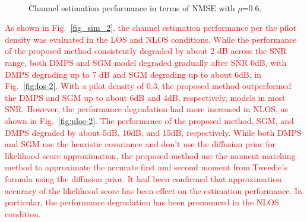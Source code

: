 \documentclass[lettersize,journal]{IEEEtran}
\begin{document}
\begin{figure}[!t]
\\
\caption{Channel estimation performance in terms of NMSE with $\rho$=0.6.}
\label{fig_sim_1}
\end{figure}

\textcolor{red}{
As shown in Fig.~\ref{fig_sim_2}, the channel estimation performance per the pilot density was evaluated in the LOS and NLOS conditions. While the performance of the proposed method consistently degraded by about 2 dB across the SNR range, both DMPS and SGM model degraded gradually after SNR 0dB, with DMPS degrading up to 7 dB and SGM degrading up to about 6dB, in Fig.~\ref{fig:los-2}. With a pilot density of 0.3, the proposed method outperformed the DMPS and SGM up to about 6dB and 4dB, respectively, models in most SNR. However, the performance degradation had more increased in NLOS, as shown in Fig.~\ref{fig:nlos-2}. The performance of the proposed method, SGM, and DMPS degraded by about 5dB, 10dB, and 15dB, respectively. While both DMPS and SGM use the heuristic covariance and don’t use the diffusion prior for likelihood score approximation, the proposed method use the moment matching method to approximate the accurate first and second moment from Tweedie’s formula using the diffusion prior. It had been confirmed that approximation accuracy of the likelihood score has been effect on the estimation performance. In particular, the performance degradation has been pronounced in the NLOS condition.
}
\end{document}
